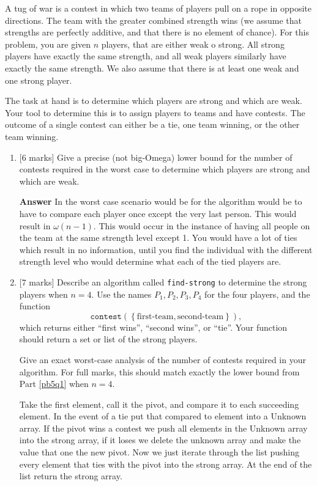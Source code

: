 \documentclass[12pt]{article}
\begin{document}
A tug of war is a contest in which two teams of players pull on a rope in
opposite directions. The team with the greater combined strength wins (we
assume that strengths are perfectly additive, and that there is no element of
chance). For this problem, you are given $n$ players, that are either weak o
strong. All strong players have exactly the same strength, and all weak
players similarly have exactly the same strength. We also assume that there is
at least one weak and one strong player.

The task at hand is to determine which players are strong and which are weak.
Your tool to determine this is to assign players to teams and have contests.
The outcome of a single contest can either be a tie, one team winning, or the
other team winning.
\begin{enumerate}
  \item \label{pb5q1}[6 marks] Give a precise (not big-Omega) lower bound for
  the number of contests required in the worst case to determine which players
  are strong and which are weak.

  \textbf{Answer} In the worst case scenario would be for the algorithm would be to have to compare each player once except the very last person. This would result in $\omega(n-1)$. This would occur in the instance of having all people on the team at the same strength level except 1. You would have a lot of ties which result in no information, until you find the individual with the different strength level who would determine what each of the tied players are.

  \item \label{pb5q2}[7 marks] Describe an algorithm called
  \texttt{find-strong} to determine the strong players when $n = 4$. Use the
  names $P_1, P_2, P_3, P_4$ for the four players, and the function
  \[ \texttt{contest} \left( \left\{ \textrm{first-team}, \textrm{second-team}
     \right\} \right), \]
  which returns either ``first wins'', ``second wins'', or ``tie''. Your
  function should return a set or list of the strong players.

  Give an exact worst-case analysis of the number of contests required in your
  algorithm. For full marks, this should match exactly the lower bound from
  Part \ref{pb5q1} when $n = 4$.

  Take the first element, call it the pivot, and compare it to each succeeding element. In the event of a tie put that compared to element into a Unknown array. If the pivot wins a contest we push all elements in the Unknown array into the strong array, if it loses we delete the unknown array and make the value that one the new pivot. Now we just iterate through the list pushing every element that ties with the pivot into the strong array. At the end of the list return the strong array.


\end{enumerate}
\end{document}
